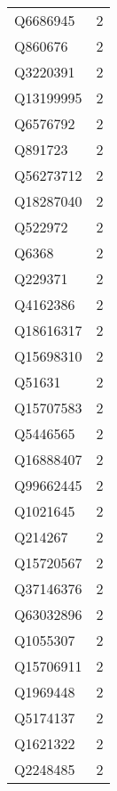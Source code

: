 \begin{tabular}{lr}
    Q6686945 &                             2 \\
     Q860676 &                             2 \\
    Q3220391 &                             2 \\
   Q13199995 &                             2 \\
    Q6576792 &                             2 \\
     Q891723 &                             2 \\
   Q56273712 &                             2 \\
   Q18287040 &                             2 \\
     Q522972 &                             2 \\
       Q6368 &                             2 \\
     Q229371 &                             2 \\
    Q4162386 &                             2 \\
   Q18616317 &                             2 \\
   Q15698310 &                             2 \\
      Q51631 &                             2 \\
   Q15707583 &                             2 \\
    Q5446565 &                             2 \\
   Q16888407 &                             2 \\
   Q99662445 &                             2 \\
    Q1021645 &                             2 \\
     Q214267 &                             2 \\
   Q15720567 &                             2 \\
   Q37146376 &                             2 \\
   Q63032896 &                             2 \\
    Q1055307 &                             2 \\
   Q15706911 &                             2 \\
    Q1969448 &                             2 \\
    Q5174137 &                             2 \\
    Q1621322 &                             2 \\
    Q2248485 &                             2 \\

\end{tabular}
